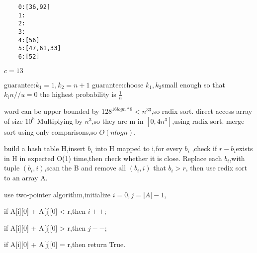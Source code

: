 \documentclass[12pt,twoside]{article}
\begin{document}


\begin{problems}

\problem  %


\begin{problemparts}
\problempart %
\begin{verbatim}
    0:[36,92]
    1:
    2:
    3:
    4:[56]
    5:[47,61,33]
    6:[52]
\end{verbatim}
\problempart %
$c = 13$
\end{problemparts}

\newpage

\problem  %

\begin{problemparts}
\problempart %
guarantee:$k_1 = 1,k_2 = n+1$
\problempart %
guarantee:choose $k_1,k_2$small enough so that $k_in//u = 0$
\problempart %
the highest probability is $\frac{1}{n}$
\end{problemparts}

\newpage

\problem  %

\begin{problemparts}
\problempart %
word can be upper bounded by $128^{16logn * 8}< n^{33}$,so radix sort. 
\problempart %
direct access array of size $10^{5}$
\problempart %
Multiplying by $n^3$,so they are m in $[0,4n^3]$,using radix sort.
\problempart %
merge sort using only comparisons,so $O(nlogn)$.
\end{problemparts}

\newpage

\problem  %

\begin{problemparts}
\problempart %
build a hash table H,insert $b_i$ into H mapped to i,for every $b_i$
,check if $r-b_i$exists in H in expected O(1) time,then check whether it is close.
\problempart %
Replace each $b_i$,with tuple $(b_i,i)$,scan the B and remove all $(b_i,i)$ that $b_i > r$,
then use redix sort to an array A.\par
use two-pointer algorithm,initialize $i=0,j=|A|-1$,\par
if A[i][0] + A[j][0] < r,then $i++$;\par
if A[i][0] + A[j][0] > r,then $j--$;\par
if A[i][0] + A[j][0] = r,then return True.
\end{problemparts}


\end{problems}
\end{document}
